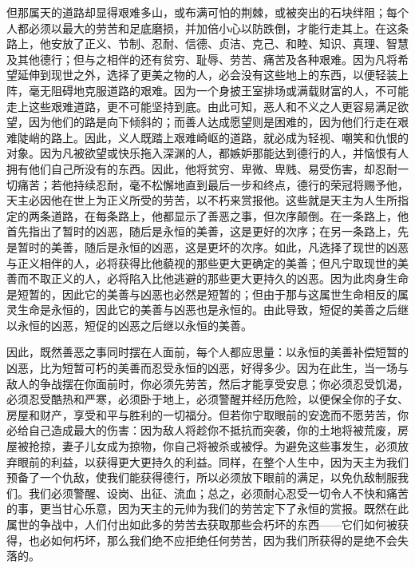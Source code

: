但那属天的道路却显得艰难多山，或布满可怕的荆棘，或被突出的石块绊阻；每个人都必须以最大的劳苦和足底磨损，并加倍小心以防跌倒，才能行走其上。在这条路上，他安放了正义、节制、忍耐、信德、贞洁、克己、和睦、知识、真理、智慧及其他德行；但与之相伴的还有贫穷、耻辱、劳苦、痛苦及各种艰难。因为凡将希望延伸到现世之外，选择了更美之物的人，必会没有这些地上的东西，以便轻装上阵，毫无阻碍地克服道路的艰难。因为一个身披王室排场或满载财富的人，不可能走上这些艰难道路，更不可能坚持到底。由此可知，恶人和不义之人更容易满足欲望，因为他们的路是向下倾斜的；而善人达成愿望则是困难的，因为他们行走在艰难陡峭的路上。因此，义人既踏上艰难崎岖的道路，就必成为轻视、嘲笑和仇恨的对象。因为凡被欲望或快乐拖入深渊的人，都嫉妒那能达到德行的人，并恼恨有人拥有他们自己所没有的东西。因此，他将贫穷、卑微、卑贱、易受伤害，却忍耐一切痛苦；若他持续忍耐，毫不松懈地直到最后一步和终点，德行的荣冠将赐予他，天主必因他在世上为正义所受的劳苦，以不朽来赏报他。这些就是天主为人生所指定的两条道路，在每条路上，他都显示了善恶之事，但次序颠倒。在一条路上，他首先指出了暂时的凶恶，随后是永恒的美善，这是更好的次序；在另一条路上，先是暂时的美善，随后是永恒的凶恶，这是更坏的次序。如此，凡选择了现世的凶恶与正义相伴的人，必将获得比他藐视的那些更大更确定的美善；但凡宁取现世的美善而不取正义的人，必将陷入比他逃避的那些更大更持久的凶恶。因为此肉身生命是短暂的，因此它的美善与凶恶也必然是短暂的；但由于那与这属世生命相反的属灵生命是永恒的，因此它的美善与凶恶也是永恒的。由此导致，短促的美善之后继以永恒的凶恶，短促的凶恶之后继以永恒的美善。\par

因此，既然善恶之事同时摆在人面前，每个人都应思量：以永恒的美善补偿短暂的凶恶，比为短暂可朽的美善而忍受永恒的凶恶，好得多少。因为在此生，当一场与敌人的争战摆在你面前时，你必须先劳苦，然后才能享受安息；你必须忍受饥渴，必须忍受酷热和严寒，必须卧于地上，必须警醒并经历危险，以便保全你的子女、房屋和财产，享受和平与胜利的一切福分。但若你宁取眼前的安逸而不愿劳苦，你必给自己造成最大的伤害：因为敌人将趁你不抵抗而突袭，你的土地将被荒废，房屋被抢掠，妻子儿女成为掠物，你自己将被杀或被俘。为避免这些事发生，必须放弃眼前的利益，以获得更大更持久的利益。同样，在整个人生中，因为天主为我们预备了一个仇敌，使我们能获得德行，所以必须放下眼前的满足，以免仇敌制服我们。我们必须警醒、设岗、出征、流血；总之，必须耐心忍受一切令人不快和痛苦的事，更当甘心乐意，因为天主的元帅为我们的劳苦定下了永恒的赏报。既然在此属世的争战中，人们付出如此多的劳苦去获取那些会朽坏的东西——它们如何被获得，也必如何朽坏，那么我们绝不应拒绝任何劳苦，因为我们所获得的是绝不会失落的。\par

